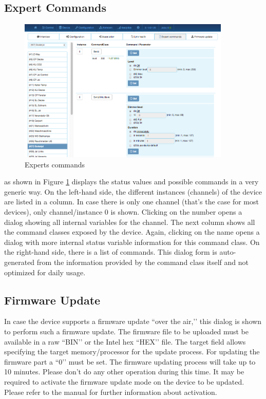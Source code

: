 \subsection{Expert Commands}

\begin{figure}
\begin{center}
\includegraphics[width=0.9\textwidth]{pngs/cap7/eui35.png}
\caption{Experts commands}
\label{eui35}
\end{center}
\end{figure}

 as shown in Figure \ref{eui35} displays the status values and 
possible commands in a very generic way. On the left-hand side, the different instances 
(channels) of the device are listed in a column. In case there is only one channel (that’s 
the case for most devices), only channel/instance 0 is shown. Clicking on the number 
opens a dialog showing all internal variables for the channel. The next column shows all 
the command classes exposed by the device. Again, clicking on the name opens a dialog with 
more internal status variable information for this command class.
On the right-hand side, there is a list of commands. This dialog form is auto-generated 
from the information provided by the command class itself and not optimized for daily usage.


\subsection{Firmware Update}

In case the device supports a firmware update ``over the air,’’ this dialog is shown to 
perform such a firmware update.  The firmware file to be uploaded must be available in a 
raw ``BIN’’ or the Intel hex ``HEX’’ file.
The target field allows specifying the target memory/processor for the update process. 
For updating the \zwave firmware part a ``0’’ must be set. The firmware updating process 
will take up to 10 minutes. Please don’t do any other operation during this time.
It may be required to activate the firmware update mode on the device to be updated. 
Please refer to the manual for further information about activation.


